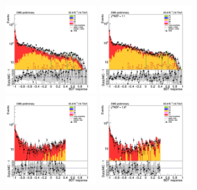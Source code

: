 
\begin{figure}[tbp]                                                                                                                                                       
  \begin{center}                                                                                                                                                          
    \includegraphics[width=0.31\textwidth]{figures/ee_300_april18/bdt_response_ee_CRDY_prefit_plot_apr18.png}                                                             
    \includegraphics[width=0.31\textwidth]{figures/ee_300_april18/bdt_response_ee_CRDY_FullPostfit_plot_apr18.png}\\                                                      
    \includegraphics[width=0.31\textwidth]{figures/ee_300_april18/ee_300_good_SR_bdt_sideBand_april18/bdt_response_afterCut_ee_SR_prefit_plot_apr18.png}                  
    \includegraphics[width=0.31\textwidth]{figures/ee_300_april18/ee_300_good_SR_bdt_sideBand_april18/bdt_response_afterCut_ee_SR_FullPostfit_plot_apr18.png}\\           

\end{center}
\end{figure}
